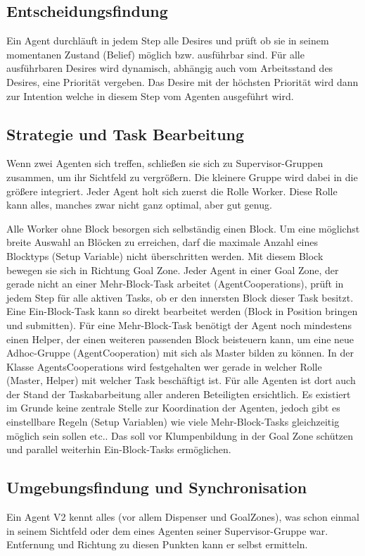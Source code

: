 \documentclass[runningheads]{llncs}
\begin{document}
	\subsection{Entscheidungsfindung}
	Ein Agent durchläuft in jedem Step alle Desires und prüft ob sie in seinem momentanen Zustand (Belief) möglich bzw. ausführbar sind. Für alle ausführbaren Desires wird dynamisch, abhängig auch vom Arbeitsstand des Desires, eine Priorität vergeben. Das Desire mit der höchsten Priorität wird dann zur Intention welche in diesem Step vom Agenten ausgeführt wird.
	
	\subsection{Strategie und Task Bearbeitung}
	Wenn zwei Agenten sich treffen, schließen sie sich zu Supervisor-Gruppen zusammen, um ihr Sichtfeld zu vergrößern. Die kleinere Gruppe wird dabei in die größere integriert. Jeder Agent holt sich zuerst die Rolle Worker. Diese Rolle kann alles, manches zwar nicht ganz optimal, aber gut genug.
	
	Alle Worker ohne Block besorgen sich selbständig einen Block. Um eine möglichst breite Auswahl an Blöcken zu erreichen, darf die maximale Anzahl eines Blocktyps (Setup Variable) nicht überschritten werden. Mit diesem Block bewegen sie sich in Richtung Goal Zone. Jeder Agent in einer Goal Zone, der gerade nicht an einer Mehr-Block-Task arbeitet (AgentCooperations), prüft in jedem Step für alle aktiven Tasks, ob er den innersten Block dieser Task besitzt. Eine Ein-Block-Task kann so direkt bearbeitet werden (Block in Position bringen und submitten). Für eine Mehr-Block-Task benötigt der Agent noch mindestens einen Helper, der einen weiteren passenden Block beisteuern kann, um eine neue Adhoc-Gruppe (AgentCooperation) mit sich als Master bilden zu können. In der Klasse AgentsCooperations wird festgehalten wer gerade in welcher Rolle (Master, Helper) mit welcher Task beschäftigt ist. Für alle Agenten ist dort auch der Stand der Taskabarbeitung aller anderen Beteiligten ersichtlich. Es existiert im Grunde keine zentrale Stelle zur Koordination der Agenten, jedoch gibt es einstellbare Regeln (Setup Variablen) wie viele Mehr-Block-Tasks gleichzeitig möglich sein sollen etc.. Das soll vor Klumpenbildung in der Goal Zone schützen und parallel weiterhin Ein-Block-Tasks ermöglichen.
	
	\subsection{Umgebungsfindung und Synchronisation}
	Ein Agent V2 kennt alles (vor allem Dispenser und GoalZones), was schon einmal in seinem Sichtfeld oder dem eines Agenten seiner Supervisor-Gruppe war. Entfernung und Richtung zu diesen Punkten kann er selbst ermitteln.
	
\end{document}
